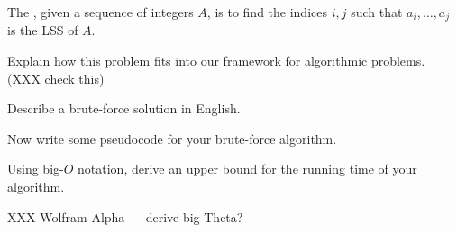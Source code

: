\documentclass{tufte-handout}
\begin{document}
\begin{defn}
  The , given a sequence of integers $A$, is to find
  the indices $i, j$ such that $a_i, \dots, a_j$ is the LSS of $A$.
\end{defn}

\begin{questions}
\item Explain how this problem fits into our framework for algorithmic
  problems. (XXX check this)
\item Describe a brute-force solution in English.
\item Now write some pseudocode for your brute-force algorithm. \vspace{2in}
\item Using big-$O$ notation, derive an upper bound for the running
  time of your algorithm.
\item XXX Wolfram Alpha --- derive big-Theta?
\end{questions}
\end{document}
